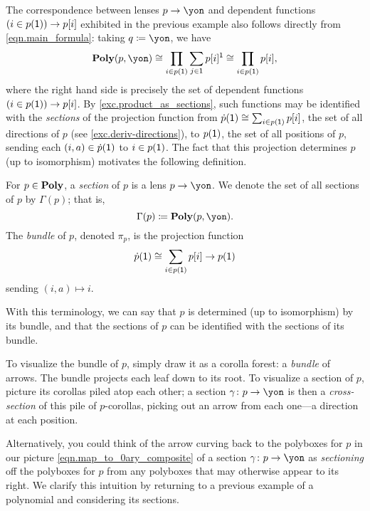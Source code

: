 \documentclass[Book-Poly]{subfiles}
\begin{document}

The correspondence between lenses $p\to\yon$ and dependent functions $(i\in p(\textsf{1}))\to p[i]$ exhibited in the previous example also follows directly from \eqref{eqn.main_formula}: taking $q\coloneqq\yon$, we have
\begin{equation} \label{eqn.gamma_prod}
\poly(p,\yon)\iso\prod_{i\in p(\1)}\sum_{j\in\1}p[i]^\1\iso\prod_{i\in p(\1)}p[i],
\end{equation}
where the right hand side is precisely the set of dependent functions $(i\in p(\textsf{1}))\to p[i]$.
By \cref{exc.product_as_sections}, such functions may be identified with the \emph{sections} of the projection function from $\dot{p}(\textsf{1})\cong\sum_{i\in p(\textsf{1})}p[i]$, the set of all directions of $p$ (see \cref{exc.deriv-directions}), to $p(\textsf{1})$, the set of all positions of $p$, sending each $(i,a)\in\dot{p}(\textsf{1})$ to $i\in p(\textsf{1})$.
The fact that this projection determines $p$ (up to isomorphism) motivates the following definition.

\begin{definition} \label{def.sec-bun}
  For $p\in\mathbf{Poly}$, a \emph{section} of $p$ is a lens $p\to\yon$.
  We denote the set of all sections of $p$ by $\Gamma(p)$; that is,
  \begin{equation} \label{eqn.gamma_def}
    \Gamma(p)\coloneqq\poly(p,\yon).
  \end{equation}
  The \emph{bundle} of $p$, denoted $\pi_p$, is the projection function
  \[
    \dot{p}(\textsf{1})\cong\sum_{i\in p(\textsf{1})}p[i]\to p(\textsf{1})
  \]
  sending $(i,a)\mapsto i$.
\end{definition}

With this terminology, we can say that $p$ is determined (up to isomorphism) by its bundle, and that the sections of $p$ can be identified with the sections of its bundle.

To visualize the bundle of $p$, simply draw it as a corolla forest: a \emph{bundle} of arrows.
The bundle projects each leaf down to its root.
To visualize a section of $p$, picture its corollas piled atop each other; a section $\gamma\colon p\to\yon$ is then a \emph{cross-section} of this pile of $p$-corollas, picking out an arrow from each one---a direction at each position.

Alternatively, you could think of the arrow curving back to the polyboxes for $p$ in our picture  \eqref{eqn.map_to_0ary_composite} of a section $\gamma\colon p\to\yon$ as \emph{sectioning} off the polyboxes for $p$ from any polyboxes that may otherwise appear to its right.
We clarify this intuition by returning to a previous example of a polynomial and considering its sections.
\end{document}
